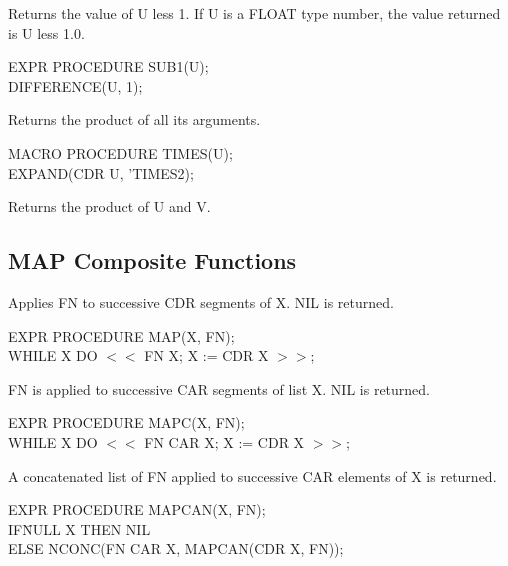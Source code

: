 {Returns the value of U less 1.  If U is a FLOAT type number, the
value returned is U less 1.0.

{\tt \begin{tabbing} EXPR PROCEDURE SUB1(U); \\
\hspace*{1em} DIFFERENCE(U, 1);
\end{tabbing}}}


{Returns the product of all its arguments.

{\tt \begin{tabbing} MACRO PROCEDURE TIMES(U); \\
\hspace*{1em} EXPAND(CDR U, 'TIMES2);
\end{tabbing}}}


{Returns the product of U and V.}


\subsection{MAP Composite Functions}


{Applies FN to successive CDR segments of X. NIL is returned.

{\tt \begin{tabbing} EXPR PROCEDURE MAP(X, FN); \\
\hspace*{1em} WHILE X DO $<<$ FN X; X := CDR X $>>$;
\end{tabbing}}}


{FN is applied to successive CAR segments of list X. NIL is returned.

{\tt \begin{tabbing} EXPR PROCEDURE MAPC(X, FN); \\
\hspace*{1em} WHILE X DO $<<$ FN CAR X; X := CDR X $>>$;
\end{tabbing}}}


{A concatenated list of FN applied to successive CAR elements of X is
returned.

{\tt \begin{tabbing} EXPR PROCEDURE MAPCAN(X, FN); \\
\hspace*{1em} IF\= NULL X THEN NIL \\
\> ELSE NCONC(FN CAR X, MAPCAN(CDR X, FN));
\end{tabbing}}}


